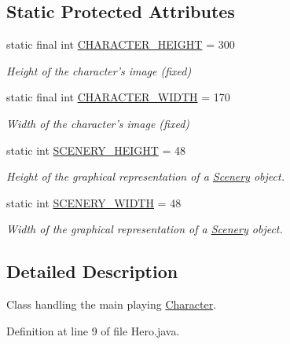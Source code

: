 \subsection*{Static Protected Attributes}
\begin{DoxyCompactItemize}
\item 
static final int \hyperlink{classworld_1_1character_1_1_character_a31596c03022d61aeb8aac56f149309be}{C\-H\-A\-R\-A\-C\-T\-E\-R\-\_\-\-H\-E\-I\-G\-H\-T} = 300
\begin{DoxyCompactList}\small\item\em Height of the character's image (fixed) \end{DoxyCompactList}\item 
static final int \hyperlink{classworld_1_1character_1_1_character_a2a46ba03b3e10896b7757f891336e8b8}{C\-H\-A\-R\-A\-C\-T\-E\-R\-\_\-\-W\-I\-D\-T\-H} = 170
\begin{DoxyCompactList}\small\item\em Width of the character's image (fixed) \end{DoxyCompactList}\item 
static int \hyperlink{classworld_1_1scenery_1_1_scenery_a106e53ae6e1647395740237ccce7f363}{S\-C\-E\-N\-E\-R\-Y\-\_\-\-H\-E\-I\-G\-H\-T} = 48
\begin{DoxyCompactList}\small\item\em Height of the graphical representation of a \hyperlink{classworld_1_1scenery_1_1_scenery}{Scenery} object. \end{DoxyCompactList}\item 
static int \hyperlink{classworld_1_1scenery_1_1_scenery_affb047c028883c6d069a03ef0f1caeb8}{S\-C\-E\-N\-E\-R\-Y\-\_\-\-W\-I\-D\-T\-H} = 48
\begin{DoxyCompactList}\small\item\em Width of the graphical representation of a \hyperlink{classworld_1_1scenery_1_1_scenery}{Scenery} object. \end{DoxyCompactList}\end{DoxyCompactItemize}


\subsection{Detailed Description}
Class handling the main playing \hyperlink{classworld_1_1character_1_1_character}{Character}. 

Definition at line 9 of file Hero.\-java.



